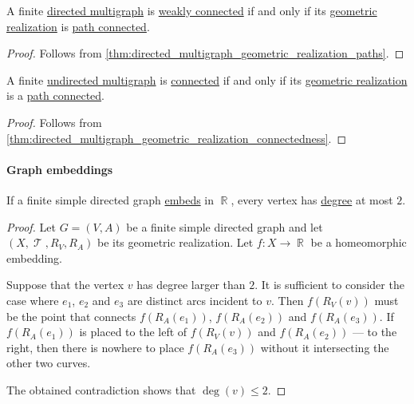 \begin{corollary}\label{thm:directed_multigraph_geometric_realization_connectedness}
  A finite \hyperref[def:directed_multigraph]{directed multigraph} is \hyperref[def:graph_connectedness/weak]{weakly connected} if and only if its \hyperref[def:graph_geometric_realization/undirected]{geometric realization} is \hyperref[def:path_connected_space]{path connected}.
\end{corollary}
\begin{proof}
  Follows from \cref{thm:directed_multigraph_geometric_realization_paths}.
\end{proof}

\begin{corollary}\label{thm:undirected_multigraph_geometric_realization_connectedness}
  A finite \hyperref[def:hypergraph/multigraph]{undirected multigraph} is \hyperref[def:graph_connectedness/undirected]{connected} if and only if its \hyperref[def:graph_geometric_realization/undirected]{geometric realization} is a \hyperref[def:path_connected_space]{path connected}.
\end{corollary}
\begin{proof}
  Follows from \cref{thm:directed_multigraph_geometric_realization_connectedness}.
\end{proof}

\paragraph{Graph embeddings}

\begin{proposition}\label{thm:linear_directed multigraph_equivalence}
  If a finite simple directed graph \hyperref[def:graph_geometric_realization/embedding]{embeds} in \( \BbbR \), every vertex has \hyperref[def:graph_cardinality/directed_degree]{degree} at most \( 2 \).
\end{proposition}
\begin{proof}
  Let \( G = (V, A) \) be a finite simple directed graph and let \( (X, \mscrT, R_V, R_A) \) be its geometric realization. Let \( f: X \to \BbbR \) be a homeomorphic embedding.

  Suppose that the vertex \( v \) has degree larger than \( 2 \). It is sufficient to consider the case where \( e_1 \), \( e_2 \) and \( e_3 \) are distinct arcs incident to \( v \). Then \( f(R_V(v)) \) must be the point that connects \( f(R_A(e_1)) \), \( f(R_A(e_2)) \) and \( f(R_A(e_3)) \). If \( f(R_A(e_1)) \) is placed to the left of \( f(R_V(v)) \) and \( f(R_A(e_2)) \) --- to the right, then there is nowhere to place \( f(R_A(e_3)) \) without it intersecting the other two curves.

  The obtained contradiction shows that \( \deg(v) \leq 2 \).
\end{proof}

